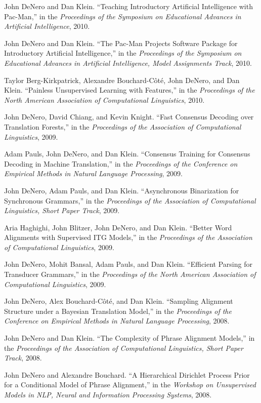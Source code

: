 \documentclass[margin,line]{res}
\begin{document}
\begin{resume}
John DeNero and Dan Klein. ``Teaching Introductory Artificial Intelligence with Pac-Man,'' in the {\it Proceedings of the Symposium on Educational Advances in Artificial Intelligence}, 2010.

John DeNero and Dan Klein. ``The Pac-Man Projects Software Package for Introductory Artificial Intelligence,'' in the {\it Proceedings of the Symposium on Educational Advances in Artificial Intelligence, Model Assignments Track}, 2010.

Taylor Berg-Kirkpatrick, Alexandre Bouchard-Côté, John DeNero, and Dan Klein. ``Painless Unsupervised Learning with Features,'' in the {\it Proceedings of the North American Association of Computational Linguistics}, 2010.

John DeNero, David Chiang, and Kevin Knight. ``Fast Consensus Decoding over Translation Forests,'' in the {\it Proceedings of the Association of Computational Linguistics}, 2009.

Adam Pauls, John DeNero, and Dan Klein. ``Consensus Training for Consensus Decoding in Machine Translation,'' in the {\it Proceedings of the Conference on Empirical Methods in Natural Language Processing}, 2009.

John DeNero, Adam Pauls, and Dan Klein. ``Asynchronous Binarization for Synchronous Grammars,'' in the {\it Proceedings of the Association of Computational Linguistics, Short Paper Track}, 2009.

Aria Haghighi, John Blitzer, John DeNero, and Dan Klein. ``Better Word Alignments with Supervised ITG Models,'' in the {\it Proceedings of the Association of Computational Linguistics}, 2009.

John DeNero, Mohit Bansal, Adam Pauls, and Dan Klein. ``Efficient Parsing for Transducer Grammars,'' in the {\it Proceedings of the North American Association of Computational Linguistics}, 2009.

John DeNero, Alex Bouchard-Côté, and Dan Klein. ``Sampling Alignment Structure under a Bayesian Translation Model,'' in the {\it Proceedings of the Conference on Empirical Methods in Natural Language Processing}, 2008.

John DeNero and Dan Klein. ``The Complexity of Phrase Alignment Models,'' in the {\it Proceedings of the Association of Computational Linguistics, Short Paper Track}, 2008.

John DeNero and Alexandre Bouchard. ``A Hierarchical Dirichlet Process Prior for a Conditional Model of Phrase Alignment,'' in the {\it Workshop on Unsupervised Models in NLP, Neural and Information Processing Systems}, 2008.


\end{resume}
\end{document}
